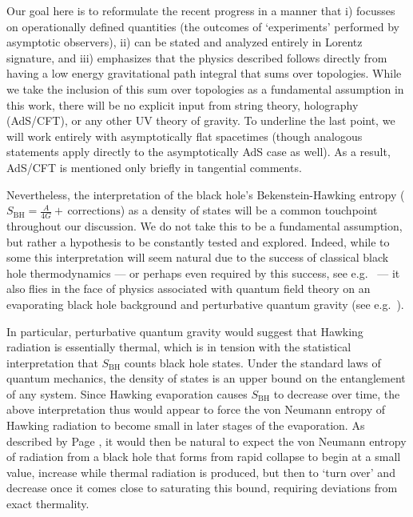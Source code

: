 \documentclass[letterpaper,12pt]{article}
\begin{document}
Our goal here is to reformulate the recent progress in a manner that i) focusses on operationally defined quantities (the outcomes of `experiments' performed by asymptotic observers),
ii) can be stated and analyzed entirely in Lorentz signature, and iii) emphasizes that the physics described follows directly from having a low energy gravitational path integral that sums over topologies.   While we take the inclusion of this sum over topologies as a fundamental assumption in this work, there will be no explicit input from string theory, holography (AdS/CFT), or any other UV theory of gravity.  To underline the last point, we will work entirely with asymptotically flat spacetimes (though analogous statements apply directly to the asymptotically AdS case as well).  As a result, AdS/CFT is mentioned only briefly in tangential comments.

Nevertheless, the interpretation of the black hole's Bekenstein-Hawking entropy ($S_\mathrm{BH} = \frac{A}{4G} +\, \text{corrections}$) as a density of states will be a common touchpoint throughout our discussion. We do not take this to be a fundamental assumption, but rather a hypothesis to be constantly tested and explored.  Indeed, while to some this interpretation will seem natural due to the success of classical black hole thermodynamics --- or perhaps even required by this success, see e.g.\ \cite{Jacobson:2005kr} ---  it also flies in the face of physics associated with quantum field theory on an evaporating black hole background and perturbative quantum gravity  (see e.g.\ \cite{Hawking:1976ra,Callan:1992rs,Ashtekar:2005cj,Unruh:2017uaw,Rovelli:2017mzl}).

In particular, perturbative quantum gravity would suggest that Hawking radiation is essentially thermal, which is in tension with the statistical interpretation that $S_\mathrm{BH}$ counts black hole states.
Under the standard laws of quantum mechanics, the density of states is an upper bound on the entanglement of any system. Since Hawking evaporation causes $S_\mathrm{BH}$ to decrease over time, the above interpretation thus would appear to force the von Neumann entropy of Hawking radiation to become small in later stages of the evaporation.  As described by Page \cite{Page:1993df}, it would then be natural to expect the von Neumann entropy of radiation from a black hole that forms from rapid collapse to begin at a small value, increase while thermal radiation is produced, but then to `turn over' and decrease once it comes close to saturating this bound, requiring deviations from exact thermality.
\end{document}
